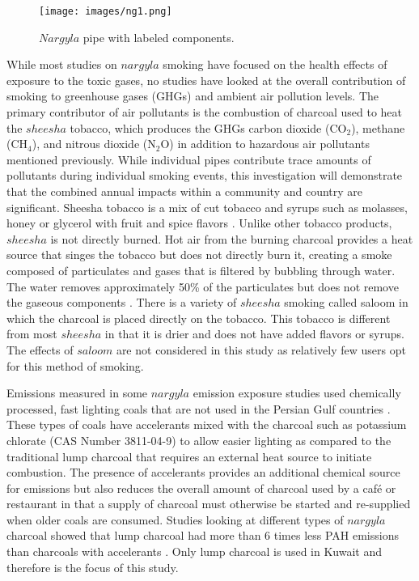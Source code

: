 %
\begin{figure}
\texttt{[image: images/ng1.png]} 
\caption{$Nargyla$ pipe with labeled components.}
\label{figng1:pipe}
\end{figure}
%
While most studies on $nargyla$ smoking have focused on the health effects of exposure to the toxic gases, no studies have looked at the overall contribution of smoking to greenhouse gases (GHGs) and ambient air pollution levels.  The primary contributor of air pollutants is the combustion of charcoal used to heat the $sheesha$ tobacco, which produces the GHGs carbon dioxide (CO$_{2}$), methane (CH$_{4}$), and nitrous dioxide (N$_{2}$O) in addition to hazardous air pollutants mentioned previously.  While individual pipes contribute trace amounts of pollutants during individual smoking events, this investigation will demonstrate that the combined annual impacts within a community and country are significant.
Sheesha tobacco is a mix of cut tobacco and syrups such as molasses, honey or glycerol with fruit and spice flavors \citep{Chaouachi2009}.  Unlike other tobacco products, $sheesha$ is not directly burned. Hot air from the burning charcoal provides a heat source that singes the tobacco but does not directly burn it, creating a smoke composed of particulates and gases \citep{Daher2010} that is filtered by bubbling through water.  The water removes approximately 50\% of the particulates but does not remove the gaseous components \citep{Becquemin2008}. There is a variety of $sheesha$ smoking called saloom in which the charcoal is placed directly on the tobacco. This tobacco is different from most $sheesha$ in that it is drier and does not have added flavors or syrups. The effects of $saloom$ are not considered in this study as relatively few users opt for this method of smoking.

Emissions measured in some $nargyla$ emission exposure studies used chemically processed, fast lighting coals that are not used in the Persian Gulf countries \citep{Daher2010, Shihadeh2005}.  These types of coals have accelerants mixed with the charcoal such as potassium chlorate (CAS Number 3811-04-9) \citep{MIC2012} to allow easier lighting as compared to the traditional lump charcoal that requires an external heat source to initiate combustion.  The presence of accelerants provides an additional chemical source for emissions but also reduces the overall amount of charcoal used by a caf\'e or restaurant in that a supply of charcoal must otherwise be started and re-supplied when older coals are consumed. Studies looking at different types of $nargyla$ charcoal showed that lump charcoal had more than 6 times less PAH emissions than charcoals with accelerants \citep{Sepetdjian2010}.  Only lump charcoal is used in Kuwait and therefore is the focus of this study.

